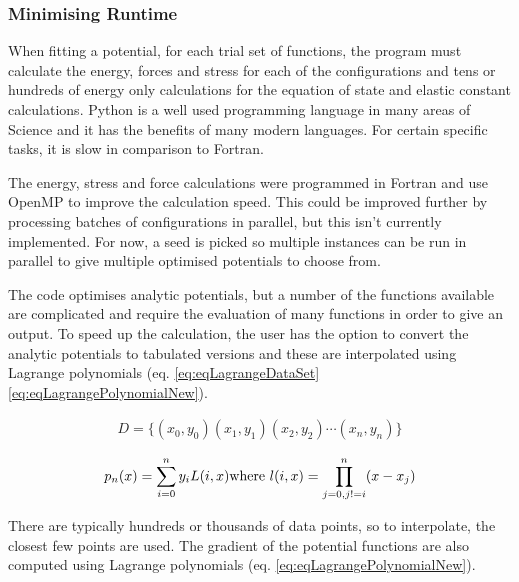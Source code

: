 \subsubsection{Minimising Runtime}

When fitting a potential, for each trial set of functions, the program must calculate the energy, forces and stress for each of the configurations and tens or hundreds of energy only calculations for the equation of state and elastic constant calculations.  Python is a well used programming language in many areas of Science and it has the benefits of many modern languages.  For certain specific tasks, it is slow in comparison to Fortran.

The energy, stress and force calculations were programmed in Fortran and use OpenMP to improve the calculation speed.  This could be improved further by processing batches of configurations in parallel, but this isn't currently implemented.  For now, a seed is picked so multiple instances can be run in parallel to give multiple optimised potentials to choose from.

The code optimises analytic potentials, but a number of the functions available are complicated and require the evaluation of many functions in order to give an output.  To speed up the calculation, the user has the option to convert the analytic potentials to tabulated versions and these are interpolated using Lagrange polynomials (eq. \ref{eq:eqLagrangeDataSet} \ref{eq:eqLagrangePolynomialNew}).

\begin{equation}
\begin{split}
D = \lbrace \left(x_0, y_0 \right) \left(x_1, y_1 \right) \left(x_2, y_2 \right) \dotsm \left(x_n, y_n \right) \rbrace
\end{split}
\label{eq:eqLagrangeDataSet}
\end{equation}

\begin{equation}
\begin{split}
p_n (x) = \sum _{i=0} ^n y_i L(i, x) 
\textnormal{where    } l(i, x) = \prod _{j=0 , j!=i} ^n (x - x_j)
\end{split}
\label{eq:eqLagrangePolynomialNew}
\end{equation}

There are typically hundreds or thousands of data points, so to interpolate, the closest few points are used.  The gradient of the potential functions are also computed using Lagrange polynomials (eq. \ref{eq:eqLagrangePolynomialNew}).


